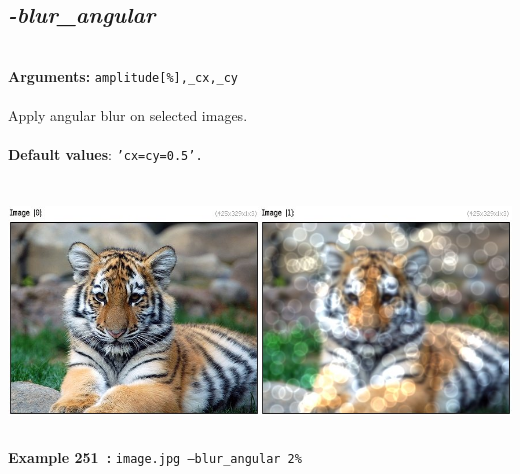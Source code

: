 \documentclass[a4paper,11pt,twoside]{book}
\begin{document}
\subsection{\emph{-blur\_angular} }\vspace*{-0.5em}
~\\\textbf{Arguments: } 
{\small \texttt{amplitude[\%],\_cx,\_cy}}\\~\\
Apply angular blur on selected images.
~\\~\\\textbf{Default values}: {\small \texttt{'cx=cy=0.5'.}}
\begin{center}\includegraphics[keepaspectratio=true,height=7cm,width=\textwidth]{img/gmic_def251.jpg}\\
{\footnotesize \textbf{Example 251~:} \texttt{image.jpg --blur\_angular 2\%}}
\end{center}
\end{document}
